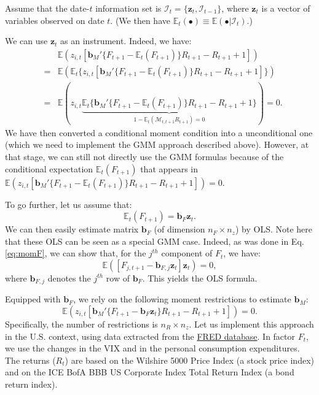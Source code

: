 \documentclass[
  12pt,
]{book}
\theoremstyle{definition}
\theoremstyle{definition}
\theoremstyle{definition}
\theoremstyle{definition}
\theoremstyle{remark}
\begin{document}
Assume that the date-\(t\) information set is \(\mathcal{I}_t=\{\textbf{z}_t,\mathcal{I}_{t-1}\}\), where \(\textbf{z}_t\) is a vector of variables observed on date \(t\). (We then have \(\mathbb{E}_t(\bullet) \equiv \mathbb{E}(\bullet|\mathcal{I}_t)\).)

We can use \(\textbf{z}_t\) as an instrument. Indeed, we have:
\begin{eqnarray}
&&\mathbb{E}(z_{i,t} [\textbf{b}_M'\{F_{t+1} - \mathbb{E}_t(F_{t+1})\}R_{t+1}-R_{t+1}+1]) \nonumber \\
&=&\mathbb{E}(\mathbb{E}_t\{z_{i,t} [\textbf{b}_M'\{F_{t+1} - \mathbb{E}_t(F_{t+1})\}R_{t+1}-R_{t+1}+1]\})\nonumber\\
&=&\mathbb{E}(z_{i,t} \underbrace{\mathbb{E}_t\{\textbf{b}_M'\{F_{t+1} - \mathbb{E}_t(F_{t+1})\}R_{t+1}-R_{t+1}+1\}}_{1 - \mathbb{E}_t(\mathcal{M}_{t,t+1}R_{t+1})=0})=0.\label{eq:momF}
\end{eqnarray}
We have then converted a conditional moment condition into a unconditional one (which we need to implement the GMM approach described above). However, at that stage, we can still not directly use the GMM formulas because of the conditional expectation \(\mathbb{E}_t(F_{t+1})\) that appears in \(\mathbb{E}(z_{i,t} [\textbf{b}_M'\{F_{t+1} - \mathbb{E}_t(F_{t+1})\}R_{t+1}-R_{t+1}+1])=0\).

To go further, let us assume that:
\[
\mathbb{E}_t(F_{t+1}) = \textbf{b}_F \textbf{z}_t.
\]
We can then easily estimate matrix \(\textbf{b}_F\) (of dimension \(n_F \times n_z\)) by OLS. Note here that these OLS can be seen as a special GMM case. Indeed, as was done in Eq. \eqref{eq:momF}, we can show that, for the \(j^{th}\) component of \(F_t\), we have:
\[
\mathbb{E}( [F_{j,t+1} - \textbf{b}_{F,j} \textbf{z}_t]\textbf{z}_{t})=0,
\]
where \(\textbf{b}_{F,j}\) denotes the \(j^{th}\) row of \(\textbf{b}_{F}\). This yields the OLS formula.

Equipped with \(\textbf{b}_F\), we rely on the following moment restrictions to estimate \(\textbf{b}_M\):
\[
\mathbb{E}(z_{i,t} [\textbf{b}_M'\{F_{t+1} - \textbf{b}_F \textbf{z}_t\}R_{t+1}-R_{t+1}+1])=0.
\]
Specifically, the number of restrictions is \(n_R \times n_z\). Let us implement this approach in the U.S. context, using data extracted from the \href{https://fred.stlouisfed.org}{FRED database}. In factor \(F_t\), we use the changes in the VIX and in the personal consumption expenditures. The returns (\(R_t\)) are based on the Wilshire 5000 Price Index (a stock price index) and on the ICE BofA BBB US Corporate Index Total Return Index (a bond return index).
\end{document}
